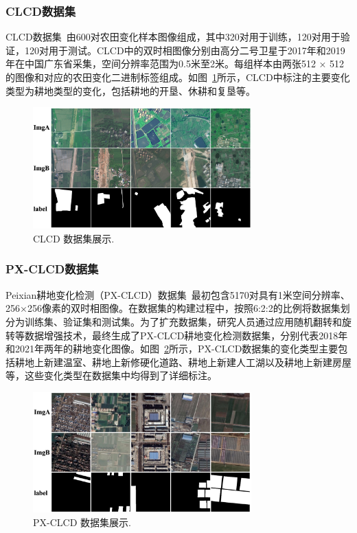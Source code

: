 \subsubsection{CLCD数据集}
CLCD数据集~\cite{Liu2022ACN}由600对农田变化样本图像组成，其中320对用于训练，120对用于验证，120对用于测试。CLCD中的双时相图像分别由高分二号卫星于2017年和2019年在中国广东省采集，空间分辨率范围为0.5米至2米。每组样本由两张512 × 512的图像和对应的农田变化二进制标签组成。如图~\ref{fig:clcd}所示，CLCD中标注的主要变化类型为耕地类型的变化，包括耕地的开垦、休耕和复垦等。

\begin{figure}[!htbp]
  \centering
  \includegraphics[width=0.75\textwidth]{paper_figures/变化检测任务与实验方法介绍/clcd.png}
  \caption{CLCD 数据集展示.}
  \label{fig:clcd}
\end{figure}

\subsubsection{PX-CLCD数据集}
Peixian耕地变化检测（PX-CLCD）数据集~\cite{miao_snunet3_2024}最初包含5170对具有1米空间分辨率、256×256像素的双时相图像。在数据集的构建过程中，按照6:2:2的比例将数据集划分为训练集、验证集和测试集。为了扩充数据集，研究人员通过应用随机翻转和旋转等数据增强技术，最终生成了PX-CLCD耕地变化检测数据集，分别代表2018年和2021年两年的耕地变化图像。如图~\ref{fig:pxclcd}所示，PX-CLCD数据集的变化类型主要包括耕地上新建温室、耕地上新修硬化道路、耕地上新建人工湖以及耕地上新建房屋等，这些变化类型在数据集中均得到了详细标注。

\begin{figure}[!htbp]
  \centering
  \includegraphics[width=0.75\textwidth]{paper_figures/变化检测任务与实验方法介绍/pxclcd.png}
  \caption{PX-CLCD 数据集展示.}
  \label{fig:pxclcd}
\end{figure}

